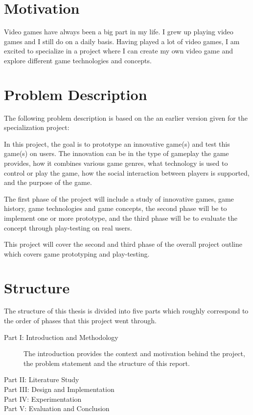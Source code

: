 \section{Motivation}
Video games have always been a big part in my life. I grew up playing video games and I still do on a daily basis. Having played a lot of video games, I am excited to specialize in a project where I can create my own video game and explore different game technologies and concepts.



\section{Problem Description}
The following problem description is based on the an earlier version given for the specialization project:

\begin{displayquote}
	In this project, the goal is to prototype an innovative game(s) and test this game(s) on users. The innovation can be in the type of gameplay the game provides, how it combines various game genres, what technology is used to control or play the game, how the social interaction between players is supported, and the purpose of the game.
	
	The first phase of the project will include a study of innovative games, game history, game technologies and game concepts, the second phase will be to implement one or more prototype, and the third phase will be to evaluate the concept through play-testing on real users.
\end{displayquote}

This project will cover the second and third phase of the overall project outline which covers game prototyping and play-testing. 



\section{Structure}
The structure of this thesis is divided into five parts which roughly correspond to the order of phases that this project went through.
\begin{description}
	\item[Part I: Introduction and Methodology]
	The introduction provides the context and motivation behind the project, the problem statement and the structure of this report.
	\item[Part II: Literature Study]
	\item[Part III: Design and Implementation]
	\item[Part IV: Experimentation]
	\item[Part V: Evaluation and Conclusion]
\end{description}
